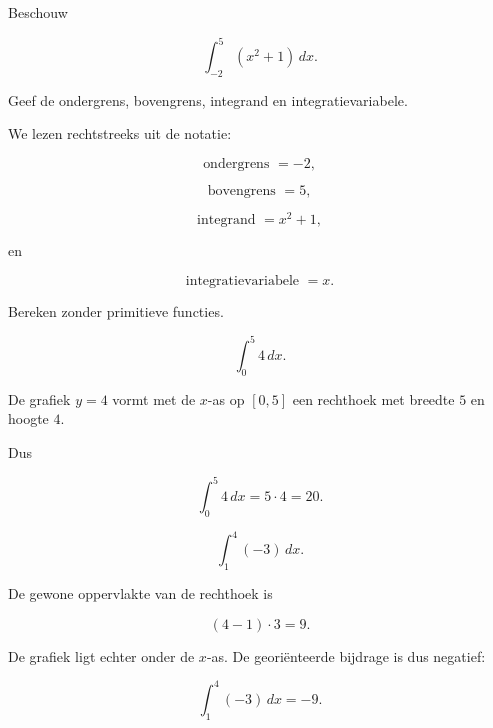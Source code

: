 \documentclass{ximera}
\begin{document}
\begin{oefening}{\oefB\ESS}

Beschouw

\[
\int_{-2}^{5}(x^2+1)\,dx.
\]

Geef de ondergrens, bovengrens, integrand en integratievariabele.

\begin{oplossing}
We lezen rechtstreeks uit de notatie:

\[
\boxed{\text{ondergrens }=-2},
\]

\[
\boxed{\text{bovengrens }=5},
\]

\[
\boxed{\text{integrand }=x^2+1},
\]

en

\[
\boxed{\text{integratievariabele }=x}.
\]
\end{oplossing}

\end{oefening}



\begin{oefening}{\oefB\ESS}

Bereken zonder primitieve functies.

\begin{question}
\[
\int_0^5 4\,dx.
\]

\begin{oplossing}
De grafiek \(y=4\) vormt met de \(x\)-as op \([0,5]\) een rechthoek met
breedte \(5\) en hoogte \(4\).

Dus

\[
\int_0^5 4\,dx
=
5\cdot4
=
\boxed{20}.
\]
\end{oplossing}
\end{question}

\begin{question}
\[
\int_1^4 (-3)\,dx.
\]

\begin{oplossing}
De gewone oppervlakte van de rechthoek is

\[
(4-1)\cdot3=9.
\]

De grafiek ligt echter onder de \(x\)-as. De georiënteerde bijdrage is
dus negatief:

\[
\int_1^4(-3)\,dx=\boxed{-9}.
\]
\end{oplossing}
\end{question}

\end{oefening}
\end{document}
